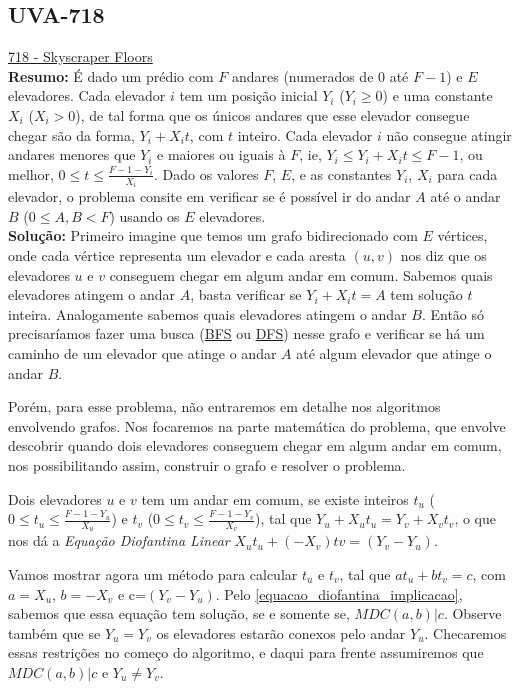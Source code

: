 \subsection{UVA-718}
\href{https://uva.onlinejudge.org/index.php?option=com_onlinejudge&Itemid=8&page=show_problem&problem=659}{718 - Skyscraper Floors}\\

\textbf{Resumo:}
É dado um prédio com $F$ andares (numerados de $0$ até $F-1$) e $E$ elevadores. Cada elevador $i$ tem um posição inicial $Y_i$ ($Y_i \geq 0$) e uma constante $X_i$ ($X_i > 0$), 
de tal forma que os únicos andares que esse elevador consegue chegar são da forma, $Y_i+X_it$, com $t$ inteiro. 
Cada elevador $i$ não consegue atingir andares menores que $Y_i$ e maiores ou iguais à $F$, ie, $Y_i \leq Y_i+X_it \leq F-1$, ou melhor, $0 \leq t \leq \frac{F-1-Y_i}{X_i}$.
Dado os valores $F$, $E$, e as constantes $Y_i$, $X_i$ para cada elevador, o problema consite em verificar se é possível ir do andar $A$ até o andar $B$ ($0\leq A,B <F$)
usando os $E$ elevadores.
\\

\textbf{Solução:} 
Primeiro imagine que temos um grafo bidirecionado com $E$ vértices, onde cada vértice representa um elevador e cada aresta $(u,v)$ nos diz que os elevadores $u$ e $v$ 
conseguem chegar em algum andar em comum.
Sabemos quais elevadores atingem o andar $A$, basta verificar se $Y_i+X_it=A$ tem solução $t$ inteira. Analogamente sabemos quais elevadores atingem o andar
$B$. Então só precisaríamos fazer uma busca (\href{https://en.wikipedia.org/wiki/Breadth-first_search}{BFS} ou \href{https://en.wikipedia.org/wiki/Depth-first_search}{DFS})
nesse grafo e verificar se há um caminho de um elevador que atinge o andar $A$ até algum elevador que atinge o andar $B$.

Porém, para esse problema, não entraremos em detalhe nos algoritmos envolvendo grafos. Nos focaremos na parte matemática do problema, que envolve descobrir quando dois elevadores conseguem chegar em algum andar em comum, nos possibilitando assim, construir o grafo e resolver o problema.

Dois elevadores $u$ e $v$ tem um andar em comum, se existe inteiros $t_u$ ($0\leq t_u\leq \frac{F-1-Y_u}{X_u}$) e $t_v$ ($0\leq t_v\leq \frac{F-1-Y_v}{X_v}$), tal que
$Y_u+X_ut_u = Y_v+X_vt_v$, o que nos dá a \textit{Equação Diofantina Linear} $X_ut_u + (-X_v)tv = (Y_v-Y_u)$.

Vamos mostrar agora um método para calcular $t_u$ e $t_v$, tal que $at_u + bt_v = c$, com $a=X_u$, $b=-X_v$ e c=$(Y_v-Y_u)$.
Pelo \autoref{equacao_diofantina_implicacao}, sabemos que essa equação tem solução, se e somente se, $MDC(a,b)|c$. Observe também que se $Y_u=Y_v$ os elevadores estarão
conexos pelo andar $Y_u$. Checaremos essas restrições no começo do algoritmo, e daqui para frente assumiremos que $MDC(a,b)|c$ e $Y_u\neq Y_v$.

